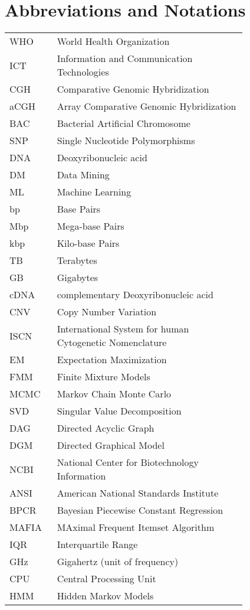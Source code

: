\chapter*{Abbreviations and Notations}
\label{ch:abbreviations}

\begin{longtable}[l]{lp{0.8\linewidth}}

WHO	& World Health Organization \\
ICT	& Information and Communication Technologies  \\
CGH	& Comparative Genomic Hybridization \\
aCGH	& Array Comparative Genomic Hybridization \\
BAC	& Bacterial Artificial Chromosome \\
SNP	& Single Nucleotide Polymorphisms\\
DNA	& Deoxyribonucleic acid  \\
DM	& Data Mining \\
ML	& Machine Learning \\
bp	& Base Pairs \\
Mbp	& Mega-base Pairs \\
kbp	& Kilo-base Pairs \\
TB	& Terabytes \\
GB	& Gigabytes \\
cDNA	& complementary Deoxyribonucleic acid \\
CNV	& Copy Number Variation \\
ISCN	& International System for human Cytogenetic Nomenclature \\
EM	& Expectation Maximization \\
FMM	& Finite Mixture Models \\
MCMC	& Markov Chain Monte Carlo \\          
SVD	& Singular Value Decomposition \\
DAG	& Directed Acyclic Graph \\
DGM	& Directed Graphical Model \\
NCBI    & National Center for Biotechnology Information \\
ANSI	& American National Standards Institute \\
BPCR	& Bayesian Piecewise Constant Regression\\
MAFIA	& MAximal Frequent Itemset Algorithm \\
IQR	& Interquartile Range \\
GHz	& Gigahertz (unit of frequency)\\
CPU	& Central Processing Unit \\
HMM	& Hidden Markov Models 

\end{longtable}
